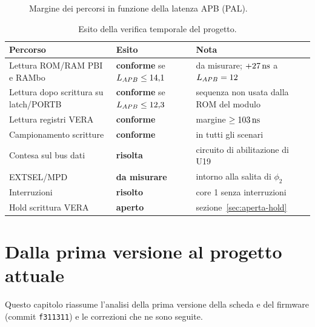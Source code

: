 \documentclass[11pt,a4paper,twoside,openright]{report}
\newcommand{\ns}{\,\mathrm{ns}}
\newcommand{\MHz}{\,\mathrm{MHz}}
\DeclareRobustCommand{\code}[1]{\begingroup\renewcommand{\_}{\textunderscore\allowbreak}\texttt{#1}\endgroup}
\newcommand{\sig}[1]{\textsf{#1}}
\begin{document}
\begin{figure}[htbp]
  \centering
  \slackplot{pal}{PAL, $f_{\phi 2} = 1{,}773\,447\MHz$}
  \caption{Margine dei percorsi in funzione della latenza APB (PAL).}
  \label{fig:slack-pal}
\end{figure}

\begin{table}[htbp]
  \centering
  \caption{Esito della verifica temporale del progetto.}
  \label{tab:esito}
  \begin{tabularx}{\textwidth}{>{\raggedright}p{4.2cm}>{\raggedright}p{2.6cm}X}
    \toprule
    \textbf{Percorso} & \textbf{Esito} & \textbf{Nota} \\
    \midrule
    Lettura ROM/RAM PBI e RAMbo & \textcolor{cOk}{\textbf{conforme}} se $L_{APB} \le 14{,}1$ & da misurare; $+\NwSlNomNTSC\ns$ a $L_{APB}=12$ \\
    Lettura dopo scrittura su latch/PORTB & \textcolor{orange!80!black}{\textbf{conforme}} se $L_{APB} \le 12{,}3$ & sequenza non usata dalla ROM del modulo \\
    Lettura registri VERA & \textcolor{cOk}{\textbf{conforme}} & margine $\ge \NwSlVeraPesNTSC\ns$ \\
    Campionamento scritture & \textcolor{cOk}{\textbf{conforme}} & in tutti gli scenari \\
    Contesa sul bus dati & \textcolor{cOk}{\textbf{risolta}} & circuito di abilitazione di U19 \\
    \sig{EXTSEL}/\sig{MPD} & \textcolor{orange!80!black}{\textbf{da misurare}} & intorno alla salita di $\phi_2$ \\
    Interruzioni & \textcolor{cOk}{\textbf{risolto}} & core 1 senza interruzioni \\
    Hold scrittura VERA & \textcolor{cBad}{\textbf{aperto}} & sezione~\ref{sec:aperta-hold} \\
    \bottomrule
  \end{tabularx}
\end{table}

\chapter{Dalla prima versione al progetto attuale}
\label{cap:evoluzione}

Questo capitolo riassume l'analisi della prima versione della scheda e del firmware
(commit \code{f311311}) e le correzioni che ne sono seguite.
\end{document}
